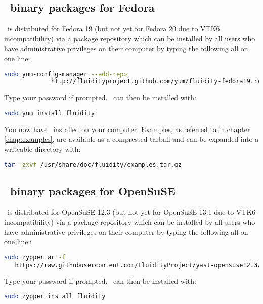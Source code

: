 \subsection{\fluidity\ binary packages for Fedora}

\fluidity\ is distributed for Fedora 19 (but not yet for Fedora 20 due to VTK6
incompatibility) via a package repository which can be installed by all users
who have administrative privileges on their computer by typing the following 
all on one line:

\begin{lstlisting}[language=Bash]
sudo yum-config-manager --add-repo
             http://fluidityproject.github.com/yum/fluidity-fedora19.repo
\end{lstlisting}

Type your password if prompted. \fluidity\ can then be installed with:

\begin{lstlisting}[language=Bash]
sudo yum install fluidity
\end{lstlisting}

You now have \fluidity\ installed on your computer. Examples, as referred to in
chapter \ref{chap:examples}, are available as a compressed tarball and can be
expanded into a writeable directory with:

\begin{lstlisting}[language=Bash]
tar -zxvf /usr/share/doc/fluidity/examples.tar.gz
\end{lstlisting}

\subsection{\fluidity\ binary packages for OpenSuSE}

\fluidity\ is distributed for OpenSuSE 12.3 (but not yet for OpenSuSE 13.1 due to VTK6
incompatibility) via a package repository which can be installed by all users
who have administrative privileges on their computer by typing the following
all on one line:i

\begin{lstlisting}[language=Bash]
sudo zypper ar -f
   https://raw.githubusercontent.com/FluidityProject/yast-opensuse12.3/master/
\end{lstlisting}

Type your password if prompted. \fluidity\ can then be installed with:

\begin{lstlisting}[language=Bash]
sudo zypper install fluidity
\end{lstlisting}

